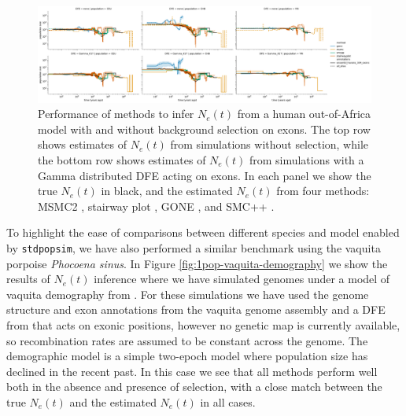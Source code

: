 \documentclass[hidelinks]{article}
\newcommand{\stdpopsim}{\texttt{stdpopsim}\xspace}
\begin{document}
    \begin{figure}[t]
        \centering
        \includegraphics[width=\textwidth]{figures/HomSap/OOA/estimated_Ne_t_final}
        \caption{
        \label{fig:1pop-human-demography}
        Performance of methods to infer $N_e(t)$ from a human out-of-Africa model \citep{ragsdale2019models}
        with and without background selection on exons. The top row shows estimates of $N_e(t)$ from simulations
        without selection, while the bottom row shows estimates of $N_e(t)$ from simulations with a Gamma distributed   
        DFE acting on exons. In each panel we show the true $N_e(t)$ in black, and the estimated $N_e(t)$ from four methods:    
        MSMC2 \citep{Schiffels2020}, stairway plot \citep{liu2020stairway}, GONE \citep{santiago2020recent}, and SMC++ \citep{terhorst2017robust}.  
        }
    \end{figure}

    To highlight the ease of comparisons between different species and model enabled by \stdpopsim,
    we have also performed a similar benchmark using the vaquita porpoise \textit{Phocoena sinus}.
    In Figure \ref{fig:1pop-vaquita-demography} we show the results of $N_e(t)$ inference
    where we have simulated genomes under a model of vaquita demography from \textcite{robinson2022critically}.
    For these simulations we have used the genome structure and exon annotations from the vaquita genome assembly
    and a DFE from \textcite{robinson2022critically} that acts on exonic positions, however no genetic map 
    is currently available, so recombination rates are assumed to be constant across the genome.
    The demographic model is a simple two-epoch model where population size has declined in the recent past. 
    In this case we see that all methods perform well both in the absence and presence of selection,
    with a close match between the true $N_e(t)$ and the estimated $N_e(t)$ in all cases.
\end{document}
